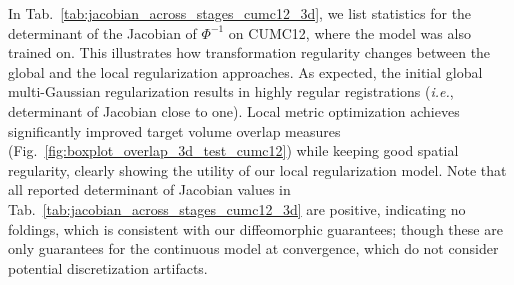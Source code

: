 \documentclass[10pt,twocolumn,letterpaper,table]{article}
\numberwithin{equation}{section}
\theoremstyle{plain}
\theoremstyle{definition}
\def\ie{\emph{i.e.}}  \def\Ie{\emph{I.e.}}
\begin{document}
In Tab.~\ref{tab:jacobian_across_stages_cumc12_3d}, we list statistics for the determinant of the Jacobian of $\Phi^{-1}$ on CUMC12, where the model was also trained on. This illustrates how transformation regularity changes between the global and the local regularization approaches. As expected, the initial global multi-Gaussian regularization results in highly regular registrations (\ie, determinant of Jacobian close to one). Local metric optimization achieves significantly improved target volume overlap measures (Fig.~\ref{fig:boxplot_overlap_3d_test_cumc12}) while keeping good spatial regularity, clearly showing the utility of our local regularization model. Note that all reported determinant of Jacobian values in Tab.~\ref{tab:jacobian_across_stages_cumc12_3d} are positive, indicating no foldings, which is consistent with our diffeomorphic guarantees; though these are only guarantees for the continuous model at convergence, which do not consider potential discretization artifacts.

\renewcommand{\tabcolsep}{3pt}
\end{document}
